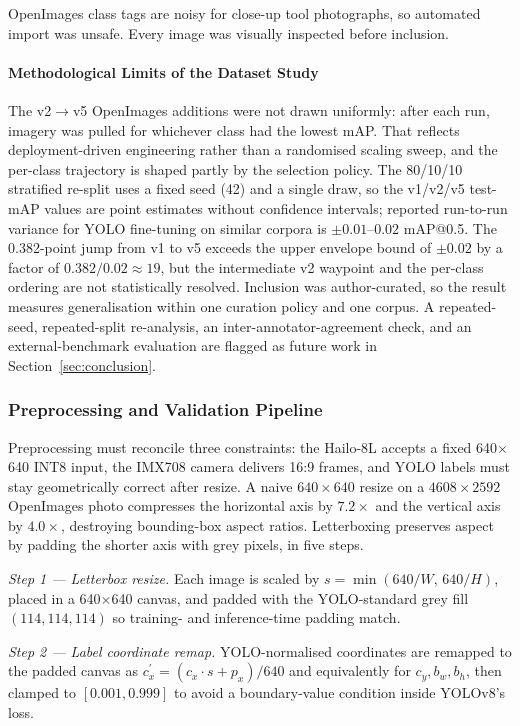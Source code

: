 \documentclass{ieeeaccess}
\begin{document}
OpenImages class tags are noisy for close-up tool photographs, so automated import was unsafe. Every image was visually inspected before inclusion.

\paragraph*{Methodological Limits of the Dataset Study}
\label{sec:dataset_limits}
The v2$\rightarrow$v5 OpenImages additions were not drawn uniformly: after each run, imagery was pulled for whichever class had the lowest mAP. That reflects deployment-driven engineering rather than a randomised scaling sweep, and the per-class trajectory is shaped partly by the selection policy. The 80/10/10 stratified re-split uses a fixed seed (42) and a single draw, so the v1/v2/v5 test-mAP values are point estimates without confidence intervals; reported run-to-run variance for YOLO fine-tuning on similar corpora is $\pm 0.01$--$0.02$ mAP{@}0.5. The 0.382-point jump from v1 to v5 exceeds the upper envelope bound of $\pm 0.02$ by a factor of $0.382 / 0.02 \approx 19$, but the intermediate v2 waypoint and the per-class ordering are not statistically resolved. Inclusion was author-curated, so the result measures generalisation within one curation policy and one corpus. A repeated-seed, repeated-split re-analysis, an inter-annotator-agreement check, and an external-benchmark evaluation are flagged as future work in Section~\ref{sec:conclusion}.

\subsubsection{Preprocessing and Validation Pipeline}
\label{sec:preprocess}
Preprocessing must reconcile three constraints: the Hailo-8L accepts a fixed 640$\times$640 INT8 input, the IMX708 camera delivers 16:9 frames, and YOLO labels must stay geometrically correct after resize. A naive $640\times640$ resize on a $4608\times2592$ OpenImages photo compresses the horizontal axis by $7.2\times$ and the vertical axis by $4.0\times$, destroying bounding-box aspect ratios. Letterboxing preserves aspect by padding the shorter axis with grey pixels, in five steps.

\textit{Step 1 --- Letterbox resize.} Each image is scaled by $s=\min(640/W,\,640/H)$, placed in a 640$\times$640 canvas, and padded with the YOLO-standard grey fill $(114,114,114)$ so training- and inference-time padding match.

\textit{Step 2 --- Label coordinate remap.} YOLO-normalised coordinates are remapped to the padded canvas as $c_x^\prime = (c_x \cdot s + p_x)/640$ and equivalently for $c_y, b_w, b_h$, then clamped to $[0.001, 0.999]$ to avoid a boundary-value condition inside YOLOv8's loss.
\end{document}
